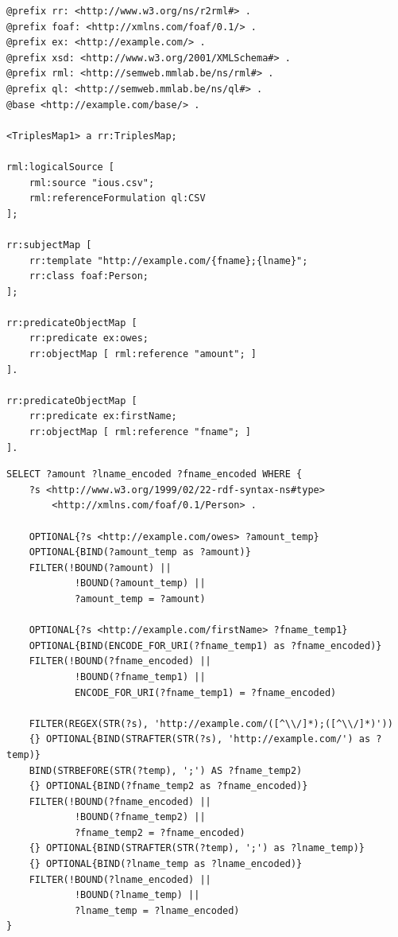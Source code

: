 \begin{lstlisting}[caption={Example mapping rule using all three map types}, label={lst:mapping_rule}, captionpos=b, basicstyle=\small, float=!ht, frame=single]
@prefix rr: <http://www.w3.org/ns/r2rml#> .
@prefix foaf: <http://xmlns.com/foaf/0.1/> .
@prefix ex: <http://example.com/> .
@prefix xsd: <http://www.w3.org/2001/XMLSchema#> .
@prefix rml: <http://semweb.mmlab.be/ns/rml#> .
@prefix ql: <http://semweb.mmlab.be/ns/ql#> .
@base <http://example.com/base/> .

<TriplesMap1> a rr:TriplesMap;
    
rml:logicalSource [ 
    rml:source "ious.csv";
    rml:referenceFormulation ql:CSV
];

rr:subjectMap [ 
    rr:template "http://example.com/{fname};{lname}";
    rr:class foaf:Person;
];

rr:predicateObjectMap [ 
    rr:predicate ex:owes; 
    rr:objectMap [ rml:reference "amount"; ]
].

rr:predicateObjectMap [ 
    rr:predicate ex:firstName; 
    rr:objectMap [ rml:reference "fname"; ]
].
\end{lstlisting}

\begin{lstlisting}[caption={Generated query for the mapping rule in listing \ref{lst:mapping_rule}}, label={lst:generated_query}, captionpos=b, basicstyle=\small, float=!ht, frame=single]
SELECT ?amount ?lname_encoded ?fname_encoded WHERE {
    ?s <http://www.w3.org/1999/02/22-rdf-syntax-ns#type> 
        <http://xmlns.com/foaf/0.1/Person> .

    OPTIONAL{?s <http://example.com/owes> ?amount_temp}
    OPTIONAL{BIND(?amount_temp as ?amount)}
    FILTER(!BOUND(?amount) || 
            !BOUND(?amount_temp) || 
            ?amount_temp = ?amount)

    OPTIONAL{?s <http://example.com/firstName> ?fname_temp1}
    OPTIONAL{BIND(ENCODE_FOR_URI(?fname_temp1) as ?fname_encoded)}
    FILTER(!BOUND(?fname_encoded) || 
            !BOUND(?fname_temp1) || 
            ENCODE_FOR_URI(?fname_temp1) = ?fname_encoded)

    FILTER(REGEX(STR(?s), 'http://example.com/([^\\/]*);([^\\/]*)'))
    {} OPTIONAL{BIND(STRAFTER(STR(?s), 'http://example.com/') as ?temp)}
    BIND(STRBEFORE(STR(?temp), ';') AS ?fname_temp2)
    {} OPTIONAL{BIND(?fname_temp2 as ?fname_encoded)}
    FILTER(!BOUND(?fname_encoded) || 
            !BOUND(?fname_temp2) || 
            ?fname_temp2 = ?fname_encoded)
    {} OPTIONAL{BIND(STRAFTER(STR(?temp), ';') as ?lname_temp)}
    {} OPTIONAL{BIND(?lname_temp as ?lname_encoded)}
    FILTER(!BOUND(?lname_encoded) || 
            !BOUND(?lname_temp) || 
            ?lname_temp = ?lname_encoded)
}
\end{lstlisting}

